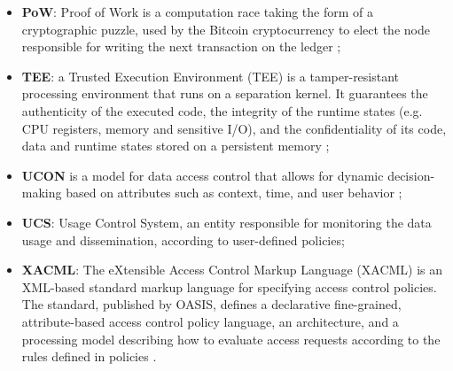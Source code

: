 \begin{itemize}
    \item[] \textbf{PoW}: Proof of Work is a computation race taking the form of a cryptographic puzzle, used by the Bitcoin cryptocurrency to elect the node responsible for writing the next transaction on the ledger \cite{Nakamoto2008}; 
    \item[] \textbf{TEE}: a Trusted Execution Environment (TEE) is a tamper-resistant processing environment that runs on a separation
    kernel. It guarantees the authenticity of the executed code, the
    integrity of the runtime states (e.g. CPU registers, memory
    and sensitive I/O), and the confidentiality of its code, data
    and runtime states stored on a persistent memory \cite{Sabt2015};
    \item[] \textbf{UCON} is a model for data access control that allows for dynamic decision-making based on attributes such as context, time, and user behavior \cite{Park2004};
    \item[] \textbf{UCS}: Usage Control System, an entity responsible for monitoring the data usage and dissemination, according to user-defined policies;
    \item[] \textbf{XACML}: The eXtensible Access Control Markup Language (XACML) is an XML-based standard markup language for specifying access control policies. The standard, published by OASIS, defines a declarative fine-grained, attribute-based access control policy language, an architecture, and a processing model describing how to evaluate access requests according to the rules defined in policies \cite{Axiomatics2023}.
\end{itemize}